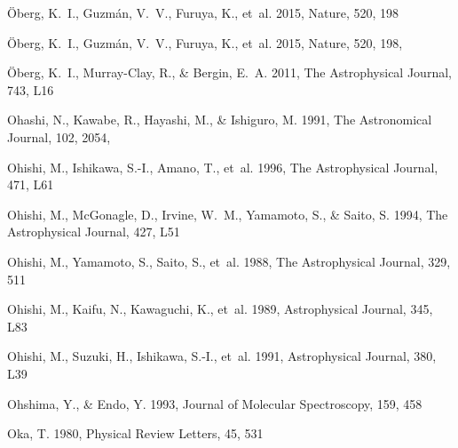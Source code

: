 \documentclass[twocolumn]{aastex631}
\begin{document}
\begin{thebibliography}{}
{\"O}berg, K.~I., Guzm{\'a}n, V.~V., Furuya, K., {et~al.} 2015, Nature, 520,
  198

{{\"O}berg}, K.~I., {Guzm{\'a}n}, V.~V., {Furuya}, K., {et~al.} 2015, Nature,
  520, 198, 

{\"O}berg, K.~I., Murray-Clay, R., \& Bergin, E.~A. 2011, The Astrophysical
  Journal, 743, L16

{Ohashi}, N., {Kawabe}, R., {Hayashi}, M., \& {Ishiguro}, M. 1991, The
  Astronomical Journal, 102, 2054, 

Ohishi, M., Ishikawa, S.-I., Amano, T., {et~al.} 1996, The Astrophysical
  Journal, 471, L61

Ohishi, M., McGonagle, D., Irvine, W.~M., Yamamoto, S., \& Saito, S. 1994, The
  Astrophysical Journal, 427, L51

Ohishi, M., Yamamoto, S., Saito, S., {et~al.} 1988, The Astrophysical Journal,
  329, 511

Ohishi, M., Kaifu, N., Kawaguchi, K., {et~al.} 1989, Astrophysical Journal,
  345, L83

Ohishi, M., Suzuki, H., Ishikawa, S.-I., {et~al.} 1991, Astrophysical Journal,
  380, L39

Ohshima, Y., \& Endo, Y. 1993, Journal of Molecular Spectroscopy, 159, 458

Oka, T. 1980, Physical Review Letters, 45, 531


\end{thebibliography}
\end{document}
